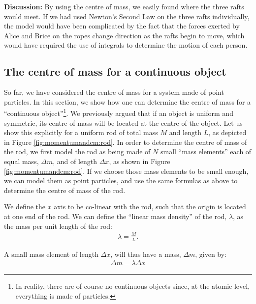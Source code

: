 \begin{example}
\textbf{Discussion: }By using the centre of mass, we easily found where the three rafts would meet. If we had used Newton's Second Law on the three rafts individually, the model would have been complicated by the fact that the forces exerted by Alice and Brice on the ropes change direction as the rafts begin to move, which would have required the use of integrals to determine the motion of each person.
\end{example}


\subsection{The centre of mass for a continuous object}
So far, we have considered the centre of mass for a system made of point particles. In this section, we show how one can determine the centre of mass for a ``continuous object''\footnote{In reality, there are of course no continuous objects since, at the atomic level, everything is made of particles.}. We previously argued that if an object is uniform and symmetric, its centre of mass will be located at the centre of the object. Let us show this explicitly for a uniform rod of total mass $M$ and length $L$, as depicted in Figure \ref{fig:momentumandcm:rod}.
In order to determine the centre of mass of the rod, we first model the rod as being made of $N$ small ``mass elements'' each of equal mass, $\Delta m$, and of length $\Delta x$, as shown in Figure \ref{fig:momentumandcm:rod}. If we choose those mass elements to be small enough, we can model them as point particles, and use the same formulas as above to determine the centre of mass of the rod.

We define the $x$ axis to be co-linear with the rod, such that the origin is located at one end of the rod. We can define the ``linear mass density'' of the rod, $\lambda$, as the mass per unit length of the rod:
\begin{align*}
\lambda = \frac{M}{L}.
\end{align*}

A small mass element of length $\Delta x$, will thus have a mass, $\Delta m$, given by:
\begin{align*}
\Delta m = \lambda \Delta x 
\end{align*}

